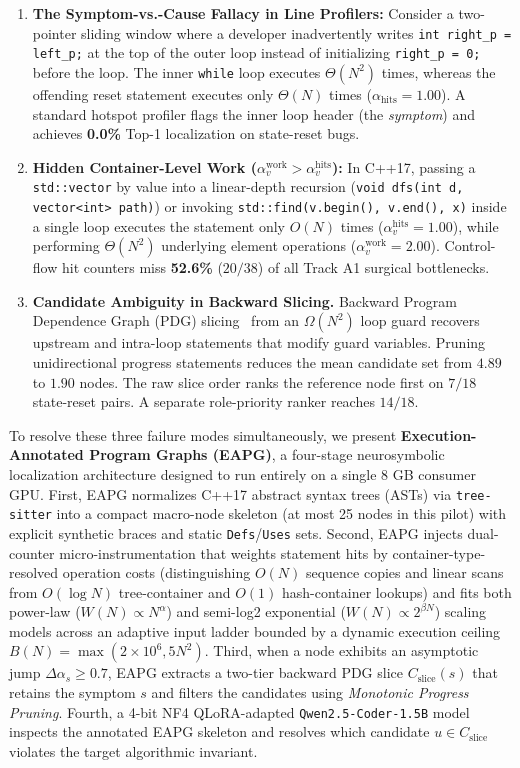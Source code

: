 \begin{enumerate}
    \item \textbf{The Symptom-vs.-Cause Fallacy in Line Profilers:} Consider a two-pointer sliding window where a developer inadvertently writes \texttt{int right\_p = left\_p;} at the top of the outer loop instead of initializing \texttt{right\_p = 0;} before the loop. The inner \texttt{while} loop executes $\Theta(N^2)$ times, whereas the offending reset statement executes only $\Theta(N)$ times ($\alpha_{\text{hits}} = 1.00$). A standard hotspot profiler flags the inner loop header (the \emph{symptom}) and achieves \textbf{0.0\%} Top-1 localization on state-reset bugs.
    \item \textbf{Hidden Container-Level Work ($\alpha_v^{\text{work}} > \alpha_v^{\text{hits}}$):} In C++17, passing a \texttt{std::vector} by value into a linear-depth recursion (\texttt{void dfs(int d, vector<int> path)}) or invoking \texttt{std::find(v.begin(), v.end(), x)} inside a single loop executes the statement only $O(N)$ times ($\alpha_v^{\text{hits}} = 1.00$), while performing $\Theta(N^2)$ underlying element operations ($\alpha_v^{\text{work}} = 2.00$). Control-flow hit counters miss \textbf{52.6\%} ($20/38$) of all Track A1 surgical bottlenecks.
    \item \textbf{Candidate Ambiguity in Backward Slicing.} Backward Program Dependence Graph (PDG) slicing~\cite{weiser1981slicing,ferrante1987pdg} from an $\Omega(N^2)$ loop guard recovers upstream and intra-loop statements that modify guard variables. Pruning unidirectional progress statements reduces the mean candidate set from $4.89$ to $1.90$ nodes. The raw slice order ranks the reference node first on $7/18$ state-reset pairs. A separate role-priority ranker reaches $14/18$.
\end{enumerate}

To resolve these three failure modes simultaneously, we present \textbf{Execution-Annotated Program Graphs (EAPG)}, a four-stage neurosymbolic localization architecture designed to run entirely on a single 8 GB consumer GPU. First, EAPG normalizes C++17 abstract syntax trees (ASTs) via \texttt{tree-sitter} into a compact macro-node skeleton (at most 25 nodes in this pilot) with explicit synthetic braces and static \texttt{Defs}/\texttt{Uses} sets. Second, EAPG injects dual-counter micro-instrumentation that weights statement hits by container-type-resolved operation costs (distinguishing $O(N)$ sequence copies and linear scans from $O(\log N)$ tree-container and $O(1)$ hash-container lookups) and fits both power-law ($W(N) \propto N^\alpha$) and semi-log2 exponential ($W(N) \propto 2^{\beta N}$) scaling models across an adaptive input ladder bounded by a dynamic execution ceiling $B(N) = \max(2\times 10^6, 5N^2)$. Third, when a node exhibits an asymptotic jump $\Delta\alpha_s \ge 0.7$, EAPG extracts a two-tier backward PDG slice $C_{\text{slice}}(s)$ that retains the symptom $s$ and filters the candidates using \emph{Monotonic Progress Pruning}. Fourth, a 4-bit NF4 QLoRA-adapted \texttt{Qwen2.5-Coder-1.5B} model inspects the annotated EAPG skeleton and resolves which candidate $u \in C_{\text{slice}}$ violates the target algorithmic invariant.

